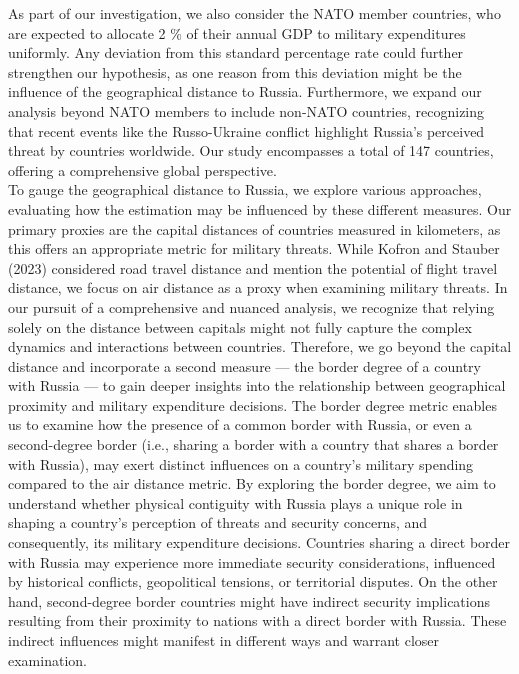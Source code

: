 \documentclass[12pt,a4paper]{article}
\begin{document}
As part of our investigation, we also consider the NATO member countries, who are expected to allocate 2 \% of their annual GDP to military expenditures uniformly. Any deviation from this standard percentage rate could further strengthen our hypothesis, as one reason from this deviation might be the influence of the geographical distance to Russia. Furthermore, we expand our analysis beyond NATO members to include non-NATO countries, recognizing that recent events like the Russo-Ukraine conflict highlight Russia's perceived threat by countries worldwide. Our study encompasses a total of 147 countries, offering a comprehensive global perspective. \\

To gauge the geographical distance to Russia, we explore various approaches, evaluating how the estimation may be influenced by these different measures. Our primary proxies are the capital distances of countries measured in kilometers, as this offers an appropriate metric for military threats. While Kofron and Stauber (2023) considered road travel distance and mention the potential of flight travel distance, we focus on air distance as a proxy when examining military threats. 
In our pursuit of a comprehensive and nuanced analysis, we recognize that relying solely on the distance between capitals might not fully capture the complex dynamics and interactions between countries. Therefore, we go beyond the capital distance and incorporate a second measure — the border degree of a country with Russia — to gain deeper insights into the relationship between geographical proximity and military expenditure decisions. The border degree metric enables us to examine how the presence of a common border with Russia, or even a second-degree border (i.e., sharing a border with a country that shares a border with Russia), may exert distinct influences on a country's military spending compared to the air distance metric. By exploring the border degree, we aim to understand whether physical contiguity with Russia plays a unique role in shaping a country's perception of threats and security concerns, and consequently, its military expenditure decisions. Countries sharing a direct border with Russia may experience more immediate security considerations, influenced by historical conflicts, geopolitical tensions, or territorial disputes. On the other hand, second-degree border countries might have indirect security implications resulting from their proximity to nations with a direct border with Russia. These indirect influences might manifest in different ways and warrant closer examination.\\
\end{document}
